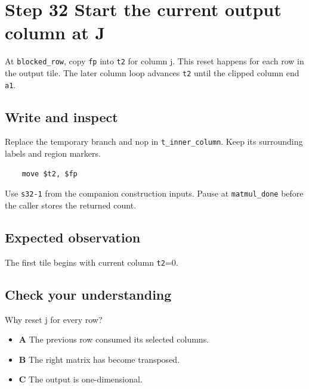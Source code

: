 \section{Step 32 Start the current output column at J}\label{matmul-s32}

At \texttt{blocked\_row}, copy \texttt{fp} into \texttt{t2} for column j. This reset happens for each row in the output tile. The later column loop advances \texttt{t2} until the clipped column end \texttt{a1}.

\subsection{Write and inspect}
Replace the temporary branch and nop in \texttt{t\_inner\_column}. Keep its surrounding labels and region markers.

\begin{verbatim}
    move $t2, $fp
\end{verbatim}
Use \texttt{s32-1} from the companion construction inputs. Pause at \texttt{matmul\_done} before the caller stores the returned count.

\subsection{Expected observation}
The first tile begins with current column \texttt{t2}=0.

\subsection{Check your understanding}
Why reset j for every row?

\begin{itemize}
  \item \textbf{A} The previous row consumed its selected columns.
  \item \textbf{B} The right matrix has become transposed.
  \item \textbf{C} The output is one-dimensional.
\end{itemize}
